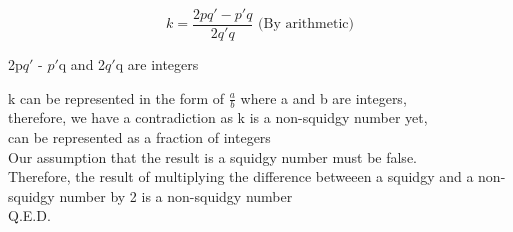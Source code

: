 \documentclass[11pt]{article}
\begin{document}
{{{\noindent
{\begin{displaymath}
    k = \frac{2pq\prime - p\prime q}{2 q\prime q} \text{ (By arithmetic)}
\end{displaymath}
}

\noindent
2p$q\prime$ - $p\prime$q and 2$q\prime$q are integers

\noindent
k can be represented in the form of $\frac{a}{b}$ where a and b are  integers, \\
therefore, we have a contradiction as k is a non-squidgy number yet, \\
can be represented as a fraction of integers \\
Our assumption that the result is a squidgy number must be false. \\
Therefore, the result of multiplying the difference betweeen a squidgy and a
non-squidgy number by 2 is a non-squidgy number \\
Q.E.D.

}}}
\end{document}
